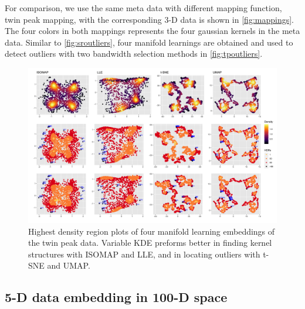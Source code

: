 \documentclass[11pt,a4paper,]{article}
\begin{document}
For comparison, we use the same meta data with different mapping function, twin peak mapping, with the corresponding 3-D data is shown in \autoref{fig:mappings}. The four colors in both mappings represents the four gaussian kernels in the meta data. Similar to \autoref{fig:sroutliers}, four manifold learnings are obtained and used to detect outliers with two bandwidth selection methods in \autoref{fig:tpoutliers}.

\begin{figure}

{\centering \includegraphics[width=0.95\linewidth]{figures/twin_peak_outliers_comparison_4ml_3cases} 

}

\caption{Highest density region plots of four manifold learning embeddings of the twin peak data. Variable KDE preforms better in finding kernel structures with ISOMAP and LLE, and in locating outliers with t-SNE and UMAP.}\label{fig:tpoutliers}
\end{figure}

\hypertarget{fivedgaussian}{%
\subsection{5-D data embedding in 100-D space}\label{fivedgaussian}}
\end{document}

